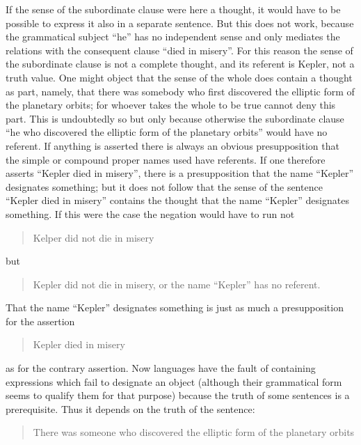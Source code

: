 \documentclass[twoside,12pt]{article}
\begin{document}
If the sense of the subordinate clause were here a thought, it would
have to be possible to express it also in a separate sentence. But
this does not work, because the grammatical subject ``he'' has no
independent sense and only mediates the relations with the consequent
clause ``died in misery''. For this reason the sense of the
subordinate clause is not a complete thought, and its referent is
Kepler, not a truth value. One might object that the sense of the
whole does contain a thought as part, namely, that there was somebody
who first discovered the elliptic form of the planetary orbits; for
whoever takes the whole to be true cannot deny this part. This is
undoubtedly so but only because otherwise the subordinate clause ``he
who discovered the elliptic form of the planetary orbits'' would have
no referent. If anything is asserted there is always an obvious
presupposition that the simple or compound proper names used have
referents. If one therefore asserts ``Kepler died in misery'', there
is a presupposition that the name ``Kepler'' designates something; but
it does not follow that the sense of the sentence ``Kepler died in
misery'' contains the thought that the name ``Kepler'' designates
something. If this were the case the negation would have to run not

\begin{quote}
  Kelper did not die in misery
\end{quote}

\noindent but

\begin{quote}
  Kepler did not die in misery, or the name ``Kepler'' has no referent.
\end{quote}

\noindent That the name ``Kepler'' designates something is just as much a
presupposition for the assertion

\begin{quote}
  Kepler died in misery
\end{quote}

\noindent as for the contrary assertion. Now languages have the fault
of containing expressions which fail to designate an object (although
their grammatical form seems to qualify them for that purpose) because
the truth of some sentences is a prerequisite. Thus it depends on the
truth of the sentence:

\begin{quote}
  There was someone who discovered the elliptic form of the planetary
  orbits
\end{quote}
\end{document}
